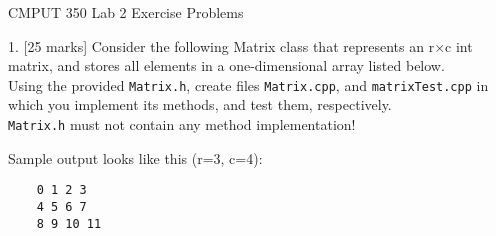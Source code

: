 \documentclass[a4paper,11pt]{article}
\begin{document}

\begin{center}
{\Large CMPUT 350 Lab 2 Exercise Problems}
\end{center}


1. [25 marks] Consider the following Matrix class that represents an r$\times$c int matrix,
and stores all elements in a one-dimensional array listed below. \\

Using the provided \texttt{Matrix.h}, create files \texttt{Matrix.cpp}, and \texttt{matrixTest.cpp} in which you
implement its methods, and test them, respectively.\\


\texttt{Matrix.h} must not contain any method implementation!


Sample  output looks like this (r=3, c=4):
\begin{verbatim}
    0 1 2 3 
    4 5 6 7 
    8 9 10 11 
\end{verbatim}


\newpage

\end{document}

